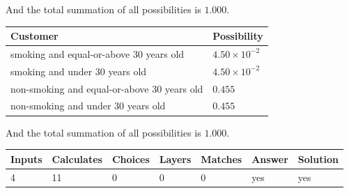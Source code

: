 \documentclass[12pt]{article}
\begin{document}
\noindent
And the total summation of all possibilities is $  %
1.000 $.
 
 
 
 
\noindent{}
 
 

 
 
 
\noindent{}
 
 

 
\noindent
\begin{tabular}{|l|l|}
\hline
Customer & Possibility \\
\hline
smoking  and  %
equal-or-above 30 years old &
  $ %
4.50 \times 10^{-2}$ \\
\hline
smoking  and  %
under 30 years old &
  $ %
4.50 \times 10^{-2}$ \\
\hline
 non-smoking and  %
equal-or-above 30 years old &
  $ %
0.455$ \\
\hline
 non-smoking and  %
under 30 years old &
  $ %
0.455$ \\
\hline
\end{tabular}
 
\noindent
 And the total summation of all possibilities is $  %
1.000 $.
 
 
 
\noindent{}
 
 

 
\vspace{0.3in}
   
   
   
   
\noindent\begin{tabular}{|l|l|l|l|l|l|l|}
 \hline
Inputs & Calculates & Choices & Layers & Matches & Answer & Solution \\ \hline
           4  & 
          11  & 
           0
  & 
           0  & 
           0  & 
  yes & 
  yes 
  \\ \hline
 \end{tabular}
   
   
   
   
\noindent{}
   
   
  
\end{document}
